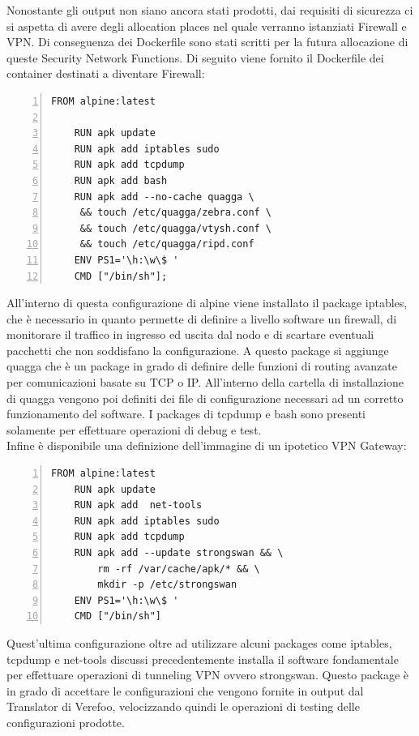 Nonostante gli output non siano ancora stati prodotti, dai requisiti di sicurezza ci si aspetta di avere degli allocation places nel quale verranno istanziati Firewall e VPN. Di conseguenza dei Dockerfile sono stati scritti per la futura allocazione di queste Security Network Functions.
Di seguito viene fornito il Dockerfile dei container destinati a diventare Firewall:
\begin{lstlisting}[style=bashstyle, caption={Definizione Dockerfile Firewall}, label=lst:bash-dockerfileEnd,numbers=left]
    FROM alpine:latest

    RUN apk update
    RUN apk add iptables sudo
    RUN apk add tcpdump
    RUN apk add bash
    RUN apk add --no-cache quagga \
     && touch /etc/quagga/zebra.conf \
     && touch /etc/quagga/vtysh.conf \
     && touch /etc/quagga/ripd.conf
    ENV PS1='\h:\w\$ '     
    CMD ["/bin/sh"];
\end{lstlisting}
All'interno di questa configurazione di alpine viene installato il package iptables, che è necessario in quanto permette di definire a livello software un firewall, di monitorare il traffico in ingresso ed uscita dal nodo e di scartare 
eventuali pacchetti che non soddisfano la configurazione. A questo package si aggiunge quagga che è un package in grado di definire delle funzioni di routing avanzate per comunicazioni basate su TCP o IP. All'interno della cartella di installazione di quagga vengono
poi definiti dei file di configurazione necessari ad un corretto funzionamento del software. I packages di tcpdump e bash sono presenti solamente per effettuare operazioni di debug e test.\\

Infine è disponibile una definizione dell'immagine di un ipotetico VPN Gateway:
\begin{lstlisting}[style=bashstyle, caption={Definizione Dockerfile VPN Gateway}, label=lst:bash-dockerfileEnd,numbers=left]
    FROM alpine:latest
    RUN apk update
    RUN apk add  net-tools 
    RUN apk add iptables sudo
    RUN apk add tcpdump
    RUN apk add --update strongswan && \
        rm -rf /var/cache/apk/* && \
        mkdir -p /etc/strongswan
    ENV PS1='\h:\w\$ ' 
    CMD ["/bin/sh"]
\end{lstlisting}

Quest'ultima configurazione oltre ad utilizzare alcuni packages come iptables, tcpdump e net-tools discussi precedentemente installa il software fondamentale per effettuare operazioni di tunneling VPN ovvero strongswan. Questo package è in grado di accettare
le configurazioni che vengono fornite in output dal Translator di Verefoo, velocizzando quindi le operazioni di testing delle configurazioni prodotte.

